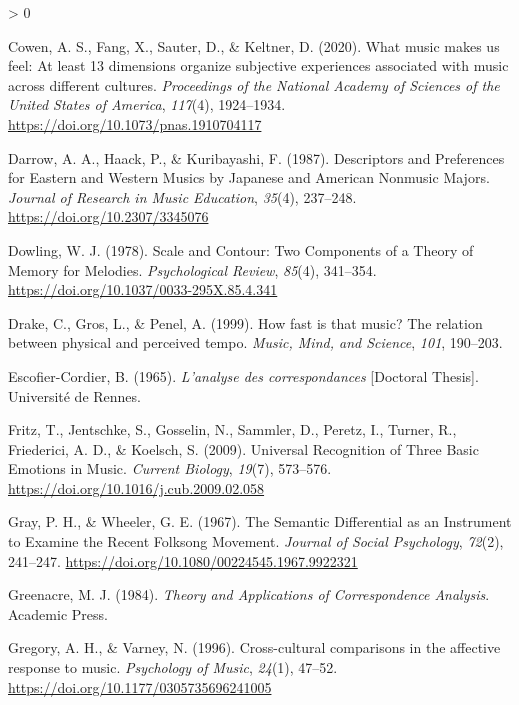 \documentclass[
  english,
  man,floatsintext]{apa6}
\newlength{\cslhangindent}
\newenvironment{CSLReferences}[2] %
 {%
  \setlength{\parindent}{0pt}
  \ifodd #1 \everypar{\setlength{\hangindent}{\cslhangindent}}\ignorespaces\fi
  \ifnum #2 > 0
  \setlength{\parskip}{#2\baselineskip}
  \fi
 }%
 {}
\begin{document}
\begin{CSLReferences}{1}{0}
\leavevmode\hypertarget{ref-Cowen2020}{}%
Cowen, A. S., Fang, X., Sauter, D., \& Keltner, D. (2020). {What music makes us feel: At least 13 dimensions organize subjective experiences associated with music across different cultures}. \emph{Proceedings of the National Academy of Sciences of the United States of America}, \emph{117}(4), 1924--1934. \url{https://doi.org/10.1073/pnas.1910704117}

\leavevmode\hypertarget{ref-Darrow1987}{}%
Darrow, A. A., Haack, P., \& Kuribayashi, F. (1987). {Descriptors and Preferences for Eastern and Western Musics by Japanese and American Nonmusic Majors}. \emph{Journal of Research in Music Education}, \emph{35}(4), 237--248. \url{https://doi.org/10.2307/3345076}

\leavevmode\hypertarget{ref-Dowling1978a}{}%
Dowling, W. J. (1978). {Scale and Contour: Two Components of a Theory of Memory for Melodies}. \emph{Psychological Review}, \emph{85}(4), 341--354. \url{https://doi.org/10.1037/0033-295X.85.4.341}

\leavevmode\hypertarget{ref-Drake1999}{}%
Drake, C., Gros, L., \& Penel, A. (1999). {How fast is that music? The relation between physical and perceived tempo.} \emph{Music, Mind, and Science}, \emph{101}, 190--203.

\leavevmode\hypertarget{ref-Escofier-Cordier1965}{}%
Escofier-Cordier, B. (1965). \emph{{L'analyse des correspondances}} {[}Doctoral Thesis{]}. Universit{é} de Rennes.

\leavevmode\hypertarget{ref-Fritz2009}{}%
Fritz, T., Jentschke, S., Gosselin, N., Sammler, D., Peretz, I., Turner, R., Friederici, A. D., \& Koelsch, S. (2009). {Universal Recognition of Three Basic Emotions in Music}. \emph{Current Biology}, \emph{19}(7), 573--576. \url{https://doi.org/10.1016/j.cub.2009.02.058}

\leavevmode\hypertarget{ref-Gray1967}{}%
Gray, P. H., \& Wheeler, G. E. (1967). {The Semantic Differential as an Instrument to Examine the Recent Folksong Movement}. \emph{Journal of Social Psychology}, \emph{72}(2), 241--247. \url{https://doi.org/10.1080/00224545.1967.9922321}

\leavevmode\hypertarget{ref-Greenacre1984}{}%
Greenacre, M. J. (1984). \emph{{Theory and Applications of Correspondence Analysis}}. Academic Press.

\leavevmode\hypertarget{ref-Gregory1996}{}%
Gregory, A. H., \& Varney, N. (1996). {Cross-cultural comparisons in the affective response to music}. \emph{Psychology of Music}, \emph{24}(1), 47--52. \url{https://doi.org/10.1177/0305735696241005}


\end{CSLReferences}
\end{document}
